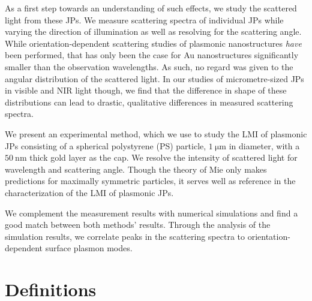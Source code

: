 \documentclass[10pt]{article}
\begin{document}
\begin{multicols}{2}
As a first step towards an understanding of such effects, we study the scattered light from these JPs. 
We measure scattering spectra of individual JPs while varying the direction of illumination as well as resolving for the scattering angle. 
While orientation-dependent scattering studies of plasmonic nanostructures %
\emph{have} been performed, \cite{Islam2021} %
that has only been the case for Au nanostructures significantly smaller than the observation wavelengths. 
As such, no regard was given to the angular distribution of the scattered light. %
In our studies of micrometre-sized JPs in visible and NIR light though, we find that the difference in shape of these distributions can lead to drastic, qualitative differences in measured scattering spectra. 

We present an experimental method, which we use to study the LMI of plasmonic JPs consisting of a spherical polystyrene (PS) particle, $\SI{1}{\micro\meter}$ in diameter, with a $\SI{50}{\nano\meter}$ thick gold layer as the cap. 
We resolve the intensity of scattered light for wavelength and scattering angle. 
Though the theory of Mie \cite{Mie1908} only makes predictions for maximally symmetric particles, it serves well as reference in the characterization of the LMI of plasmonic JPs. 

We complement the measurement results with numerical simulations and find a good match between both methods' results. 
Through the analysis of the simulation results, we correlate peaks in the scattering spectra to orientation-dependent surface plasmon modes. 





\section*{Definitions}



\end{multicols}
\end{document}
